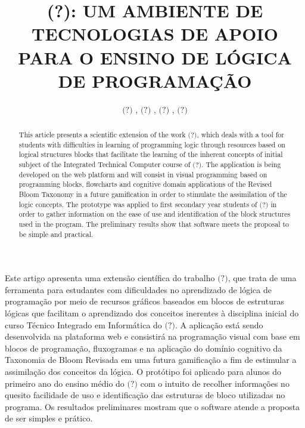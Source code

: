 \documentclass[12pt]{article}
\title{(?): UM AMBIENTE DE TECNOLOGIAS DE APOIO PARA O ENSINO DE LÓGICA DE PROGRAMAÇÃO}
\author{$\textbf{(?)}$ \inst{1}, $\textbf{(?)}$ \inst{1}, $\textbf{(?)}$ \inst{1}, $\textbf{(?)}$ \inst{1}}
\begin{document}
 

\maketitle

\begin{abstract}
This article presents a scientific extension of the work $\textit{(?)}$, which deals with a tool for students with difficulties in learning of programming logic through resources based on logical structures blocks that facilitate the learning of the inherent concepts of initial subject of the Integrated Technical Computer course of $\textit{(?)}$. The application is being developed on the web platform and will consist in visual programming based on programming blocks, flowcharts and cognitive domain applications of the Revised Bloom Taxonomy in a future gamification in order to stimulate the assimilation of the logic concepts. The prototype was applied to first secondary year students of $\textit{(?)}$ in order to gather information on the ease of use and identification of the block structures used in the program. The preliminary results show that software meets the proposal to be simple and practical.
\end{abstract}
     
\begin{resumo}
Este artigo apresenta uma extensão científica do trabalho $\textit{(?)}$, que trata de uma ferramenta para estudantes com dificuldades no aprendizado de lógica de programação por meio de recursos gráficos baseados em blocos de estruturas lógicas que facilitam o aprendizado dos conceitos inerentes à disciplina inicial do curso Técnico Integrado em Informática do $\textit{(?)}$. A aplicação está sendo desenvolvida na plataforma web e consistirá na programação visual com base em blocos de programação, fluxogramas e na aplicação do domínio cognitivo da Taxonomia de Bloom Revisada em uma futura gamificação a fim de estimular a assimilação dos conceitos da lógica.  O protótipo foi aplicado para alunos do primeiro ano do ensino médio do $\textit{(?)}$ com o intuito de recolher informações no quesito facilidade de uso e identificação das estruturas de bloco utilizadas no programa. Os resultados preliminares mostram que o software atende a proposta de ser simples e prático.  
\end{resumo}
\end{document}
